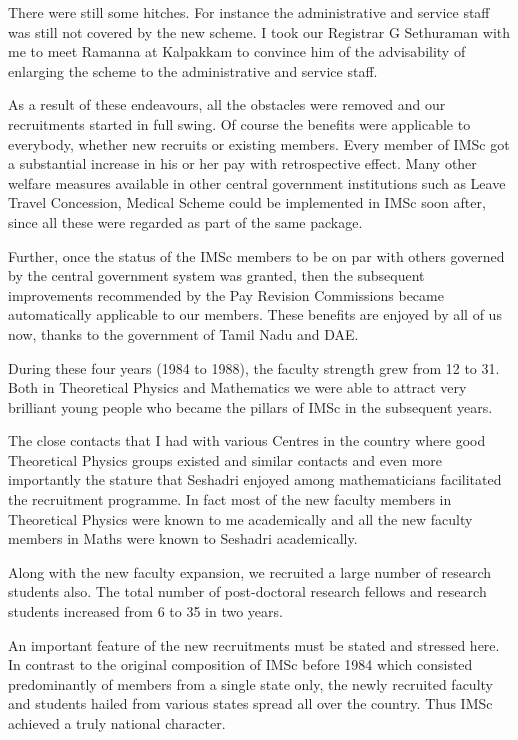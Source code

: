 There were still some hitches. For instance the administrative and 
service staff was still not covered by the new scheme. I took our 
Registrar G Sethuraman with me to meet Ramanna at Kalpakkam to convince 
him of the advisability of enlarging the scheme to the administrative 
and service staff.

As a result of these endeavours, all the obstacles were removed and our 
recruitments started in full swing. Of course the benefits were 
applicable to everybody, whether new recruits or existing members. Every 
member of IMSc got a substantial increase in his or her pay with 
retrospective effect. Many other welfare measures available in other 
central government institutions such as Leave Travel Concession, Medical 
Scheme could be implemented in IMSc soon after, since all these were 
regarded as part of the same package.

Further, once the status of the IMSc members to be on par with others 
governed by the central government system was granted, then the 
subsequent improvements recommended by the Pay Revision Commissions 
became automatically applicable to our members. These benefits are 
enjoyed by all of us now, thanks to the government of Tamil Nadu and 
DAE.

During these four years (1984 to 1988), the faculty strength grew from 
12 to 31. Both in Theoretical Physics and Mathematics we were able to 
attract very brilliant young people who became the pillars of IMSc in 
the subsequent years.

The close contacts that I had with various Centres in the country where 
good Theoretical Physics groups existed and similar contacts and even 
more importantly the stature that Seshadri enjoyed among mathematicians 
facilitated the recruitment programme. In fact most of the new faculty 
members in Theoretical Physics were known to me academically and all the 
new faculty members in Maths were known to Seshadri academically.

Along with the new faculty expansion, we recruited a large number of 
research students also. The total number of post-doctoral research 
fellows and research students increased from 6 to 35 in two years.

An important feature of the new recruitments must be stated and stressed 
here. In contrast to the original composition of IMSc before 1984 which 
consisted predominantly of members from a single state only, the newly 
recruited faculty and students hailed from various states spread all 
over the country. Thus IMSc achieved a truly national character.


